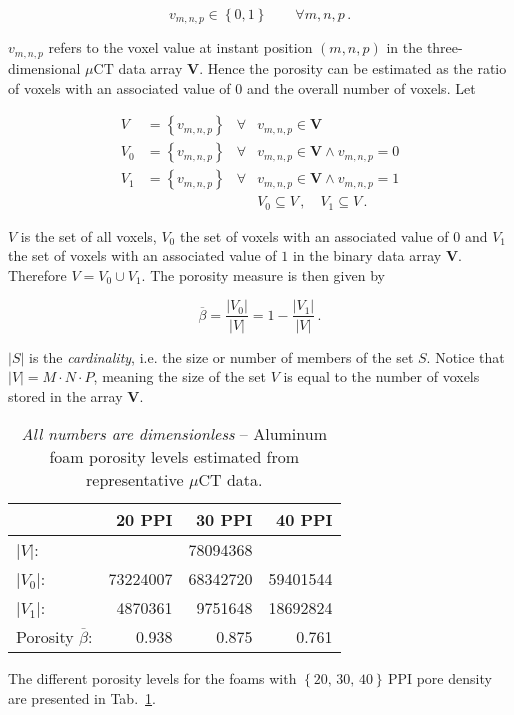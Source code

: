 \begin{equation}
   v_{m,n,p}\in\left\{0,1\right\}\qquad\forall m,n,p\,.
\end{equation}

\noindent $v_{m,n,p}$ refers to the voxel value at instant position $\left(m,n,p\right)$ in the three-dimensional $\mu\text{CT}$ data array ${\mathbf V}$. Hence the porosity can be estimated as the ratio of voxels with an associated value of 0 and the overall number of voxels. Let

\begin{align*}
   V&=\left\{v_{m,n,p}\right\} & \forall & v_{m,n,p}\in {\mathbf V} \\
   V_0&=\left\{v_{m,n,p}\right\} & \forall & v_{m,n,p}\in {\mathbf V}\wedge v_{m,n,p}=0 \\
   V_1&=\left\{v_{m,n,p}\right\} & \forall & v_{m,n,p}\in {\mathbf V}\wedge v_{m,n,p}=1 \\
   & & & V_0 \subseteq V\,,\quad V_1 \subseteq V\,.
\end{align*}

\noindent $V$ is the set of all voxels, $V_0$ the set of voxels with an associated value of $0$ and $V_1$ the set of voxels with an associated value of $1$ in the binary data array ${\mathbf V}$. Therefore $V=V_0\cup V_1$. The porosity measure is then given by

\begin{equation}
   \overline{\beta} = \frac{\left|V_0\right|}{\left|V\right|}=1-\frac{\left|V_1\right|}{\left|V\right|}\,.
\end{equation}

\noindent $\left|S\right|$ is the \textit{cardinality}, i.e. the size or number of members of the set $S$. Notice that $\left|V\right|=M\cdot N\cdot P$, meaning the size of the set $V$ is equal to the number of voxels stored in the array ${\mathbf V}$.

\begin{table}[htbp]
   \centering
   \caption[Aluminum foam porosity levels.]{\textit{All numbers are dimensionless} -- Aluminum foam porosity levels estimated from representative $\mu\text{CT}$ data.}
   \begin{tabular}{l*{3}{r}}
      \toprule
       & 20 PPI & 30 PPI & 40 PPI \\
      \midrule
      $\left|V\right|$: & \multicolumn{3}{c}{78094368} \\
      $\left|V_0\right|$: & 73224007 &  68342720 & 59401544 \\
      $\left|V_1\right|$: & 4870361 & 9751648 & 18692824 \\
      \midrule
      Porosity $\overline{\beta}$: & 0.938 & 0.875 & 0.761 \\
      \bottomrule
   \end{tabular}
   \label{tab:FoamPorosities}
\end{table}

The different porosity levels for the foams with $\left\{20,\, 30,\,40\right\}\,\text{PPI}$ pore density are presented in Tab.~\ref{tab:FoamPorosities}.

\endinput